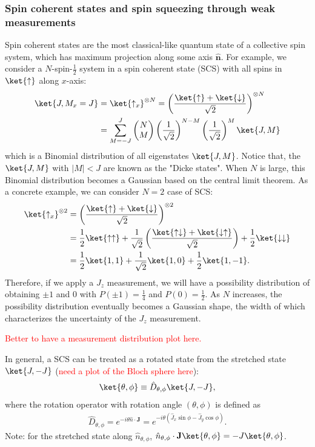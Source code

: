 \documentclass[]{report}
\begin{document}
\subsubsection{Spin coherent states and spin squeezing through weak measurements}
Spin coherent states are the most classical-like quantum state of a collective spin system, which has maximum projection along some axis $ \hat{\mathbf{n}} $. For example, we consider a $ N $-spin-$ \frac{1}{2} $ system in a spin coherent state (SCS) with all spins in $ \ket{\uparrow} $ along $ x $-axis:
\begin{align}
\ket{J,M_x=J} &=\ket{\uparrow_x}^{\otimes N} = \left(\frac{\ket{\uparrow}+\ket{\downarrow}}{\sqrt{2}}\right)^{\otimes N}\\
&= \sum_{M=-J}^J \left( \begin{matrix}N\\ M \end{matrix} \right) \left( \frac{1}{\sqrt{2}}\right)^{N-M} \left( \frac{1}{\sqrt{2}}\right)^{M} \ket{J,M}
\end{align}
which is a Binomial distribution of all eigenstates $ \ket{J,M} $. Notice that, the $ \ket{J,M} $ with $ |M|<J $ are known as the "Dicke states". 
When $ N $ is large, this Binomial distribution becomes a Gaussian based on the central limit theorem. As a concrete example, we can consider $ N=2 $ case of SCS:
\begin{align}
\ket{\uparrow_x}^{\otimes 2} &= \left(\frac{\ket{\uparrow}+\ket{\downarrow}}{\sqrt{2}}\right)^{\otimes 2}\\
&= \frac{1}{2}\ket{\uparrow\uparrow} +\frac{1}{\sqrt{2}}\left(\frac{\ket{\uparrow\downarrow}+\ket{\downarrow\uparrow}}{\sqrt{2}} \right) + \frac{1}{2}\ket{\downarrow\downarrow}\\
&= \frac{1}{2}\ket{1,1}+\frac{1}{\sqrt{2}}\ket{1,0}+\frac{1}{2}\ket{1,-1}.
\end{align}
Therefore, if we apply a $ J_z $ measurement, we will have a possibility distribution of obtaining $ \pm 1 $ and $ 0 $ with $ P(\pm 1)=\frac{1}{4} $ and $ P(0)=\frac{1}{2} $. As $ N $ increases, the possibility distribution eventually becomes a Gaussian shape, the width of which characterizes the uncertainty of the $ J_z $ measurement. 

\textcolor{red}{Better to have a measurement distribution plot here.}

In general, a SCS can be treated as a rotated state from the stretched state $ \ket{J,-J} $ (\textcolor{red}{need a plot of the Bloch sphere here}):
\begin{align}
\ket{\theta,\phi} \equiv \hat{D}_{\theta,\phi} \ket{J,-J},
\end{align} 
where the rotation operator with rotation angle $ (\theta,\phi) $ is defined as
\begin{align}
\hat{D}_{\theta,\phi} =e^{-i\theta\hat{n}\cdot \mathbf{J}}=e^{-i\theta (\hat{J}_x\sin \phi - \hat{J}_y\cos \phi) }. 
\end{align}
Note: for the stretched state along $ \hat{n}_{\theta,\phi} $, $ \hat{n}_{\theta,\phi}\cdot \mathbf{J}\ket{\theta,\phi}=-J\ket{\theta,\phi} $. 
\end{document}

